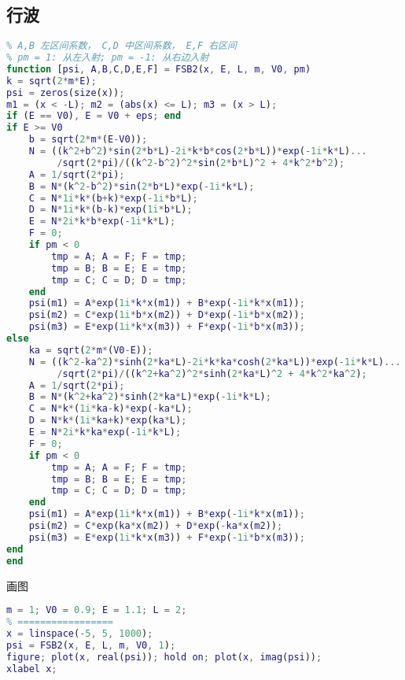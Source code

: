 \subsection{行波}

\begin{lstlisting}[language=matlab, caption=FSB2.m]
% m 质量，V0 势垒，E 能量， L 势垒半宽， odd 奇函数 true 偶函数 false
% A,B 左区间系数， C,D 中区间系数， E,F 右区间
% pm = 1: 从左入射; pm = -1: 从右边入射
function [psi, A,B,C,D,E,F] = FSB2(x, E, L, m, V0, pm)
k = sqrt(2*m*E);
psi = zeros(size(x));
m1 = (x < -L); m2 = (abs(x) <= L); m3 = (x > L);
if (E == V0), E = V0 + eps; end
if E >= V0
    b = sqrt(2*m*(E-V0));
    N = ((k^2+b^2)*sin(2*b*L)-2i*k*b*cos(2*b*L))*exp(-1i*k*L)...
         /sqrt(2*pi)/((k^2-b^2)^2*sin(2*b*L)^2 + 4*k^2*b^2);
    A = 1/sqrt(2*pi);
    B = N*(k^2-b^2)*sin(2*b*L)*exp(-1i*k*L);
    C = N*1i*k*(b+k)*exp(-1i*b*L);
    D = N*1i*k*(b-k)*exp(1i*b*L);
    E = N*2i*k*b*exp(-1i*k*L);
    F = 0;
    if pm < 0
        tmp = A; A = F; F = tmp;
        tmp = B; B = E; E = tmp;
        tmp = C; C = D; D = tmp;
    end
    psi(m1) = A*exp(1i*k*x(m1)) + B*exp(-1i*k*x(m1));
    psi(m2) = C*exp(1i*b*x(m2)) + D*exp(-1i*b*x(m2));
    psi(m3) = E*exp(1i*k*x(m3)) + F*exp(-1i*b*x(m3));
else
    ka = sqrt(2*m*(V0-E));
    N = ((k^2-ka^2)*sinh(2*ka*L)-2i*k*ka*cosh(2*ka*L))*exp(-1i*k*L)...
         /sqrt(2*pi)/((k^2+ka^2)^2*sinh(2*ka*L)^2 + 4*k^2*ka^2);
    A = 1/sqrt(2*pi);
    B = N*(k^2+ka^2)*sinh(2*ka*L)*exp(-1i*k*L);
    C = N*k*(1i*ka-k)*exp(-ka*L);
    D = N*k*(1i*ka+k)*exp(ka*L);
    E = N*2i*k*ka*exp(-1i*k*L);
    F = 0;
    if pm < 0
        tmp = A; A = F; F = tmp;
        tmp = B; B = E; E = tmp;
        tmp = C; C = D; D = tmp;
    end
    psi(m1) = A*exp(1i*k*x(m1)) + B*exp(-1i*k*x(m1));
    psi(m2) = C*exp(ka*x(m2)) + D*exp(-ka*x(m2));
    psi(m3) = E*exp(1i*k*x(m3)) + F*exp(-1i*b*x(m3));
end
end
\end{lstlisting}

画图
\begin{lstlisting}[language=matlab]
% === 设置参数 =====
m = 1; V0 = 0.9; E = 1.1; L = 2;
% =================
x = linspace(-5, 5, 1000);
psi = FSB2(x, E, L, m, V0, 1);
figure; plot(x, real(psi)); hold on; plot(x, imag(psi));
xlabel x;
\end{lstlisting}
